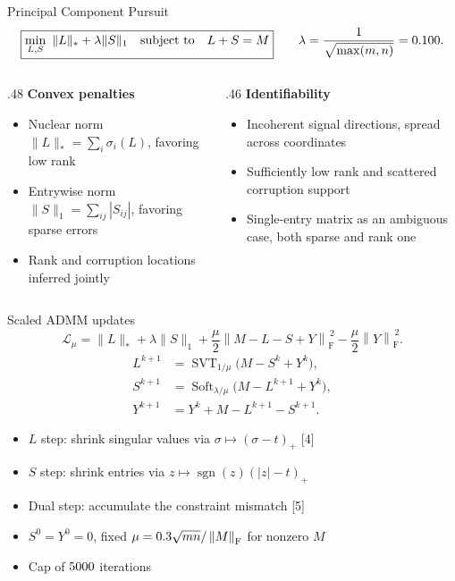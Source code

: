 \documentclass[aspectratio=1610,11pt]{beamer}
\newcommand{\frob}[1]{\left\lVert#1\right\rVert_{\mathrm F}}
\newcommand{\heading}[1]{\textcolor{accent}{\textbf{#1}}\par\smallskip}
\newcommand{\sourcehint}[1]{\vspace{1mm}{\scriptsize\textcolor{muted}{#1}}\par}
\newcommand{\bullets}{\begin{itemize}\setlength{\itemsep}{2.6mm}}
\newcommand{\closeitems}{\end{itemize}}
\begin{document}
\begin{frame}[t]{Principal Component Pursuit}
  \[
    \boxed{\min_{L,S}\ \|L\|_*+\lambda\|S\|_1
    \quad\text{subject to}\quad L+S=M}
    \qquad \lambda=\frac{1}{\sqrt{\max(m,n)}}=0.100 .
  \]
  \vspace{3mm}
  \begin{columns}[T,onlytextwidth]
    \begin{column}{.48\textwidth}
      \heading{Convex penalties}
      \bullets
        \item Nuclear norm \(\|L\|_*=\sum_i\sigma_i(L)\), favoring low rank
        \item Entrywise norm \(\|S\|_1=\sum_{ij}|S_{ij}|\), favoring sparse errors
        \item Rank and corruption locations inferred jointly
      \closeitems
    \end{column}
    \begin{column}{.46\textwidth}
      \heading{Identifiability}
      \bullets
        \item Incoherent signal directions, spread across coordinates
        \item Sufficiently low rank and scattered corruption support
        \item Single-entry matrix as an ambiguous case, both sparse and rank one
      \closeitems
    \end{column}
  \end{columns}
  \sourcehint{PCP formulation and conditional recovery guarantees [3]}
\end{frame}

\begin{frame}[t]{Scaled ADMM updates}
  \[
    \mathcal L_\mu=
    \|L\|_*+\lambda\|S\|_1+
    \frac{\mu}{2}\frob{M-L-S+Y}^{\,2}
    -\frac{\mu}{2}\frob{Y}^{\,2}.
  \]
  \[
    \begin{aligned}
      L^{k+1} &= \operatorname{SVT}_{1/\mu}\big(M-S^k+Y^k\big),\\
      S^{k+1} &= \operatorname{Soft}_{\lambda/\mu}\big(M-L^{k+1}+Y^k\big),\\
      Y^{k+1} &= Y^k+M-L^{k+1}-S^{k+1}.
    \end{aligned}
  \]
  \bullets
    \item \(L\) step: shrink singular values via \(\sigma\mapsto(\sigma-t)_+\) [4]
    \item \(S\) step: shrink entries via \(z\mapsto\operatorname{sgn}(z)(|z|-t)_+\)
    \item Dual step: accumulate the constraint mismatch [5]
    \item \(S^0=Y^0=0\), fixed \(\mu=\PenaltyScale\sqrt{mn}/\frob{M}\) for nonzero \(M\)
    \item Cap of \(5000\) iterations
  \closeitems
\end{frame}
\end{document}
